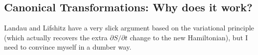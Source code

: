 \documentclass[12pt]{article}
\newcommand*{\rd}[2]{\frac{\mathrm{d}#1}{\mathrm{d}#2}}
\newcommand*{\pd}[2]{\frac{\partial#1}{\partial#2}}
\newcommand*{\p}[1]{\left(#1\right)}
\newcommand*{\z}[1]{\left\{#1\right\}}
\begin{document}
\subsection{Canonical Transformations: Why does it work?}

Landau and Lifshitz have a very slick argument based on the variational
principle (which actually recovers the extra $\partial S/\partial t$ change to
the new Hamiltonian), but I need to convince myself in a dumber way.

\end{document}
